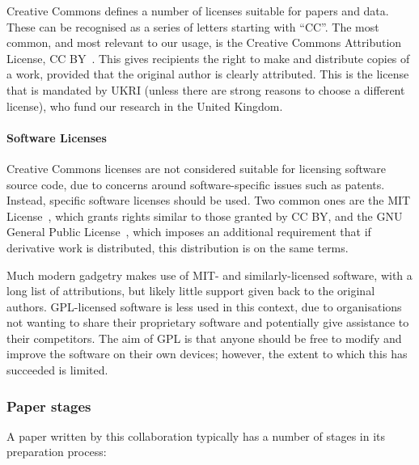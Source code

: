 \documentclass{article}
\begin{document}
Creative Commons defines a number of licenses suitable for papers and data.
These can be recognised as a series of letters starting with ``CC''.
The most common,
and most relevant to our usage,
is the Creative Commons Attribution License,
CC BY~\cite{cc-by}.
This gives recipients the right to make and distribute copies of a work,
provided that the original author is clearly attributed.
This is the license that is mandated by UKRI
(unless there are strong reasons to choose a different license),
who fund our research in the United Kingdom.

\paragraph{Software Licenses}

Creative Commons licenses are not considered
suitable for licensing software source code,
due to concerns around software-specific issues such as patents.
Instead,
specific software licenses should be used.
Two common ones are the MIT License~\cite{mit},
which grants rights similar to those granted by CC BY,
and the GNU General Public License~\cite{gpl},
which imposes an additional requirement that
if derivative work is distributed,
this distribution is on the same terms.

Much modern gadgetry makes use of MIT- and similarly-licensed software,
with a long list of attributions,
but likely little support given back to the original authors.
GPL-licensed software is less used in this context,
due to organisations not wanting to share their proprietary software
and potentially give assistance to their competitors.
The aim of GPL is that
anyone should be free to modify and improve the software on their own devices;
however,
the extent to which this has succeeded is limited.

\subsubsection{Paper stages}

A paper written by this collaboration
typically has a number of stages in its preparation process:
\end{document}
